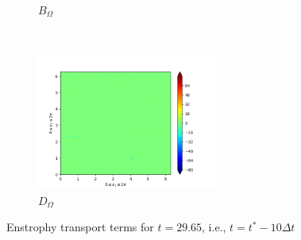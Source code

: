 \begin{figure}[H]
\begin{subfigure}{0.45\textwidth}
        \caption{$B_{\Omega}$}
    \end{subfigure}
    ~
    \begin{subfigure}{0.45\textwidth}
        \includegraphics[height=1.75in]{media/run-cds-65/D-enst-1330.png}
        \caption{$D_{\Omega}$}
    \end{subfigure}
    \caption{Enstrophy transport terms for $t=29.65$, i.e., $t=t^{\ast} - 10 \Delta t$}
    \label{fig:enst-1330}
\end{figure}

\newpage

